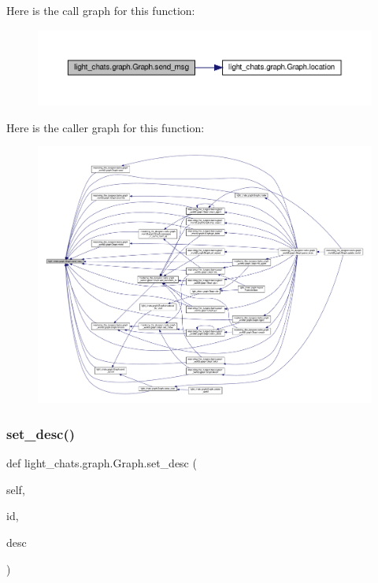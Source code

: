 Here is the call graph for this function\+:
\nopagebreak
\begin{figure}[H]
\begin{center}
\leavevmode
\includegraphics[width=350pt]{classlight__chats_1_1graph_1_1Graph_a966d3719771ddc58c520f0821c18d959_cgraph}
\end{center}
\end{figure}
Here is the caller graph for this function\+:
\nopagebreak
\begin{figure}[H]
\begin{center}
\leavevmode
\includegraphics[width=350pt]{classlight__chats_1_1graph_1_1Graph_a966d3719771ddc58c520f0821c18d959_icgraph}
\end{center}
\end{figure}
\mbox{\label{classlight__chats_1_1graph_1_1Graph_a6039eea576e68156be7fcaa7a3929358}} 
\subsubsection{\texorpdfstring{set\+\_\+desc()}{set\_desc()}}
{\footnotesize\ttfamily def light\+\_\+chats.\+graph.\+Graph.\+set\+\_\+desc (\begin{DoxyParamCaption}\item[{}]{self,  }\item[{}]{id,  }\item[{}]{desc }\end{DoxyParamCaption})}



